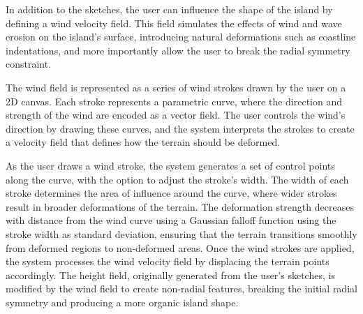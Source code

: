 In addition to the sketches, the user can influence the shape of the island by defining a wind velocity field. This field simulates the effects of wind and wave erosion on the island's surface, introducing natural deformations such as coastline indentations, and more importantly allow the user to break the radial symmetry constraint.

The wind field is represented as a series of wind strokes drawn by the user on a 2D canvas. Each stroke represents a parametric curve, where the direction and strength of the wind are encoded as a vector field. The user controls the wind's direction by drawing these curves, and the system interprets the strokes to create a velocity field that defines how the terrain should be deformed.

As the user draws a wind stroke, the system generates a set of control points along the curve, with the option to adjust the stroke's width. The width of each stroke determines the area of influence around the curve, where wider strokes result in broader deformations of the terrain.
The deformation strength decreases with distance from the wind curve using a Gaussian falloff function using the stroke width as standard deviation, ensuring that the terrain transitions smoothly from deformed regions to non-deformed areas.
Once the wind strokes are applied, the system processes the wind velocity field by displacing the terrain points accordingly. The height field, originally generated from the user's sketches, is modified by the wind field to create non-radial features, breaking the initial radial symmetry and producing a more organic island shape.










